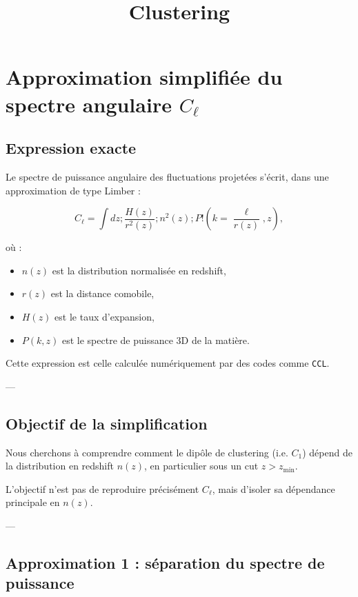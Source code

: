 \documentclass[a4paper,11pt]{article}
\title{Clustering}
\author{}
\date{}
\begin{document}
\maketitle

\section{Approximation simplifiée du spectre angulaire $C_\ell$}

\subsection{Expression exacte}

Le spectre de puissance angulaire des fluctuations projetées s'écrit, dans une approximation de type Limber :

\begin{equation}
C_\ell = \int dz ; \frac{H(z)}{r^2(z)} ; n^2(z); P!\left(k=\frac{\ell}{r(z)}, z\right),
\end{equation}

où :
\begin{itemize}
\item $n(z)$ est la distribution normalisée en redshift,
\item $r(z)$ est la distance comobile,
\item $H(z)$ est le taux d'expansion,
\item $P(k,z)$ est le spectre de puissance 3D de la matière.
\end{itemize}

Cette expression est celle calculée numériquement par des codes comme \texttt{CCL}.

---

\subsection{Objectif de la simplification}

Nous cherchons à comprendre comment le dipôle de clustering (i.e. $C_1$) dépend de la distribution en redshift $n(z)$, en particulier sous un cut $z > z_{\min}$.

L'objectif n'est pas de reproduire précisément $C_\ell$, mais d'isoler sa dépendance principale en $n(z)$.

---

\subsection{Approximation 1 : séparation du spectre de puissance}
\end{document}
